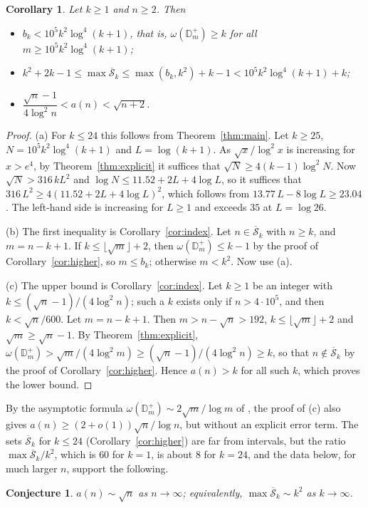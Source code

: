 \documentclass[11pt]{amsart}
\newtheorem{corollary}[theorem]{Corollary}
\newtheorem{conjecture}[theorem]{Conjecture}
\theoremstyle{remark}
\numberwithin{equation}{section}
\newcommand{\Dp}{\mathbb D^{+}}
\newcommand{\fl}[1]{\lfloor #1\rfloor}
\newcommand{\Sb}{\overline{\mathcal S}}
\begin{document}
\begin{corollary}\label{cor:effective}
Let $k\ge1$ and $n\ge2$. Then
\begin{itemize}
\item[(a)] $b_k<10^5k^2\log^4(k+1)$, that is, $\omega(\Dp_m)\ge k$ for all $m\ge10^5k^2\log^4(k+1)$;
\item[(b)] $k^2+2k-1\le\max\Sb_k\le\max(b_k,k^2)+k-1<10^5k^2\log^4(k+1)+k$;
\item[(c)] $\dfrac{\sqrt n-1}{4\log^2n}<a(n)<\sqrt{n+2}$.
\end{itemize}
\end{corollary}
\begin{proof}
(a) For $k\le24$ this follows from Theorem~\ref{thm:main}. Let $k\ge25$, $N=10^5k^2\log^4(k+1)$ and $L=\log(k+1)$. As
$\sqrt x/\log^2x$ is increasing for $x>e^4$, by Theorem~\ref{thm:explicit} it suffices that $\sqrt N\ge4(k-1)\log^2N$. Now
$\sqrt N>316\,kL^2$ and $\log N\le11.52+2L+4\log L$, so it suffices that $316\,L^2\ge4(11.52+2L+4\log L)^2$, which follows from
$13.77\,L-8\log L\ge23.04$. The left-hand side is increasing for $L\ge1$ and exceeds $35$ at $L=\log26$.

(b) The first inequality is Corollary~\ref{cor:index}. Let $n\in\Sb_k$ with $n\ge k$, and $m=n-k+1$. If $k\le\fl{\sqrt m}+2$, then
$\omega(\Dp_m)\le k-1$ by the proof of Corollary~\ref{cor:higher}, so $m\le b_k$; otherwise $m<k^2$. Now use (a).

(c) The upper bound is Corollary~\ref{cor:index}. Let $k\ge1$ be an integer with $k\le(\sqrt n-1)/(4\log^2n)$; such a $k$ exists only if
$n>4\cdot10^5$, and then $k<\sqrt n/600$. Let $m=n-k+1$. Then $m>n-\sqrt n>192$, $k\le\fl{\sqrt m}+2$ and $\sqrt m\ge\sqrt n-1$. By
Theorem~\ref{thm:explicit}, $\omega(\Dp_m)>\sqrt m/(4\log^2m)\ge(\sqrt n-1)/(4\log^2n)\ge k$, so that $n\notin\Sb_k$ by the proof of
Corollary~\ref{cor:higher}. Hence $a(n)>k$ for all such $k$, which proves the lower bound.
\end{proof}

By the asymptotic formula $\omega(\Dp_m)\sim2\sqrt m/\log m$ of \cite{B17,BLMS}, the proof of (c) also gives
$a(n)\ge(2+o(1))\sqrt n/\log n$, but without an explicit error term. The sets $\Sb_k$ for $k\le24$ (Corollary~\ref{cor:higher}) are far
from intervals, but the ratio $\max\Sb_k/k^2$, which is $60$ for $k=1$, is about $8$ for $k=24$, and the data below, for much larger
$n$, support the following.

\begin{conjecture}\label{conj:index}
$a(n)\sim\sqrt n$ as $n\to\infty$; equivalently, $\max\Sb_k\sim k^2$ as $k\to\infty$.
\end{conjecture}
\end{document}
